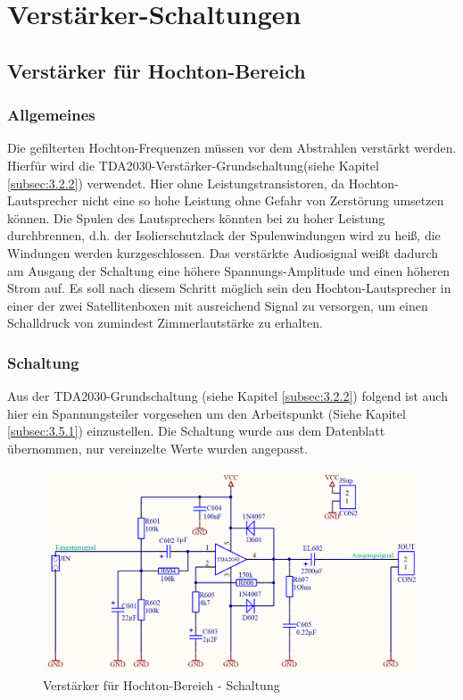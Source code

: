 \section{Verstärker-Schaltungen}


\subsection{Verstärker für Hochton-Bereich}
\subsubsection{Allgemeines}\label{subsec:4.5.1}
Die gefilterten Hochton-Frequenzen müssen vor dem Abstrahlen verstärkt werden.
Hierfür wird die TDA2030-Verstärker-Grundschaltung(siehe Kapitel \ref{subsec:3.2.2}) verwendet.
Hier ohne Leistungstransistoren, da Hochton-Lautsprecher nicht eine so hohe Leistung ohne Gefahr von Zerstörung umsetzen können.
Die Spulen des Lautsprechers könnten bei zu hoher Leistung durchbrennen, d.h. der Isolierschutzlack der Spulenwindungen wird zu heiß, die Windungen werden kurzgeschlossen.
Das verstärkte Audiosignal weißt dadurch am Ausgang der Schaltung eine höhere Spannungs-Amplitude und einen höheren Strom auf.
Es soll nach diesem Schritt möglich sein den Hochton-Lautsprecher in einer der zwei Satellitenboxen mit ausreichend Signal zu versorgen, um einen Schalldruck von zumindest Zimmerlautstärke zu erhalten. 


\subsubsection{Schaltung}\label{subsec:4.5.2}
Aus der TDA2030-Grundschaltung (siehe Kapitel \ref{subsec:3.2.2}) folgend ist auch hier ein Spannungsteiler vorgesehen um den Arbeitspunkt (Siehe Kapitel \ref{subsec:3.5.1}) einzustellen.
Die Schaltung wurde aus dem Datenblatt übernommen, nur vereinzelte Werte wurden angepasst. 

\begin{figure} [H]
	\centering	
	\includegraphics[width=1\textwidth]{img/Print6/HTVerstaerker-Schem.PNG}
	\caption{Verstärker für Hochton-Bereich - Schaltung}
	\label {fig:4.5.2.1}
\end{figure}


